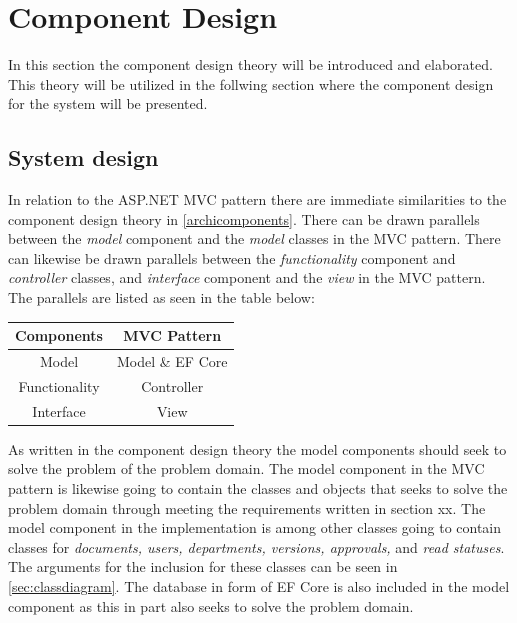 \section{Component Design} \label{sec:componentdesign}

In this section the component design theory will be introduced and elaborated.
This theory will be utilized in the follwing section where the component design for the system will be presented.



\subsection{System design}

In relation to the ASP.NET MVC pattern there are immediate similarities to the component design theory in \cref{archicomponents}.
There can be drawn parallels between the \textit{model} component and the \textit{model} classes in the MVC pattern.
There can likewise be drawn parallels between the \textit{functionality} component and \textit{controller} classes, and \textit{interface} component and the \textit{view} in the MVC pattern.
The parallels are listed as seen in the table below:

\begin{center}
	\begin{tabular}{| c | c | }
	\hline
	\textbf{Components} & \textbf{MVC Pattern} \\
	\hline
	Model & Model \& EF Core \\
	\hline
	Functionality & Controller \\
	\hline
	Interface & View \\
	\hline
\end{tabular}
\end{center}

As written in the component design theory the model components should seek to solve the problem of the problem domain.
The model component in the MVC pattern is likewise going to contain the classes and objects that seeks to solve the problem domain through meeting the requirements written in section xx.
The model component in the implementation is among other classes going to contain classes for \textit{documents, users, departments, versions, approvals,} and \textit{read statuses}.
The arguments for the inclusion for these classes can be seen in \cref{sec:classdiagram}.
The database in form of EF Core is also included in the model component as this in part also seeks to solve the problem domain.

